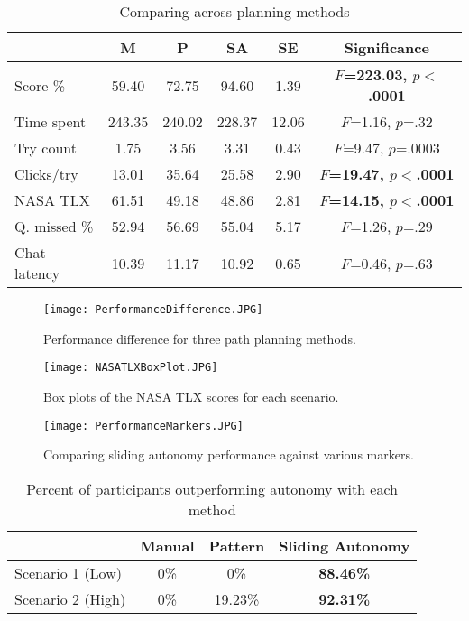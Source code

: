 \begin{table}
\caption{Comparing across planning methods}
	\centering
		\begin{tabular}
			{|l|c|c|c|c|c|}
			\hline
			& M & P & SA & SE & Significance \\
			\hline
			Score \% & 59.40 & 72.75 & 94.60 & 1.39 & \textbf{$F$=223.03, $p<$.0001} \\
			Time spent & 243.35 & 240.02 & 228.37 & 12.06 & $F$=1.16, $p$=.32 \\
			Try count & 1.75 & 3.56 & 3.31 & 0.43 & $F$=9.47, $p$=.0003 \\
			Clicks/try & 13.01 & 35.64 & 25.58 & 2.90 & \textbf{$F$=19.47, $p<$.0001} \\
			NASA TLX & 61.51 & 49.18 & 48.86 & 2.81 & \textbf{$F$=14.15, $p<$.0001} \\
			\hline
			Q. missed \% & 52.94 & 56.69 & 55.04 & 5.17 & $F$=1.26, $p$=.29 \\
			Chat latency & 10.39 & 11.17 & 10.92 & 0.65 & $F$=0.46, $p$=.63 \\
			\hline			
		\end{tabular}
\label{AAcrossMethods}
\end{table}

\begin{figure}
\centering
\texttt{[image: PerformanceDifference.JPG]}
\caption{Performance difference for three path planning methods.}
\label{APerformanceDifference}
\end{figure}

\begin{figure}
\centering
\texttt{[image: NASATLXBoxPlot.JPG]}
\caption{Box plots of the NASA TLX scores for each scenario.}
\label{ANASATLX}
\end{figure}

\begin{figure}
\centering
\texttt{[image: PerformanceMarkers.JPG]}
\caption{Comparing sliding autonomy performance against various markers.}
\label{APerformanceMarkers}
\end{figure}

\begin{table}
\caption{Percent of participants outperforming autonomy with each method}
	\centering
		\begin{tabular}
			{|l|c|c|c|}
			\hline
			 & Manual & Pattern & Sliding Autonomy \\
			\hline
			Scenario 1 (Low) & 0\% & 0\% & \textbf{88.46\%} \\
			\hline
			Scenario 2 (High) & 0\% & 19.23\% & \textbf{92.31\%} \\
			\hline			
		\end{tabular}
\label{ACompareToFullAutonomy}
\end{table}


